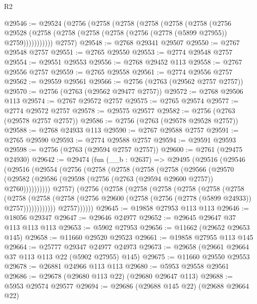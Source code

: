 \begin{lexlean}{R2}
\begin{coremodule}
@29546 := @29524
    (@2756
      (@2758
        (@2758
          (@2758
            (@2758
              (@2758
                (@2756
                  @29528
                  (@2758 (@2758 (@2758 (@2758 (@2756 (@2778 (@5899 @27955)) @2759)))))))))))
      @2757)
@29548 := @2768 @29341 @29507
@29550 := @2767 @29548 @2757
@29551 := @2765 @29550
@29553 := @2774 @29548 @2757
@29554 := @29551 @29553
@29556 := @2768 @29452 @113
@29558 := @2767 @29556 @2757
@29559 := @2765 @29558
@29561 := @2774 @29556 @2757
@29562 := @29559 @29561
@29566 := @2756 (@2763 (@29562 @2757 @2757))
@29570 := @2756 (@2763 (@29562 @29477 @2757))
@29572 := @2768 @29506 @113
@29574 := @2767 @29572 @2757
@29575 := @2765 @29574
@29577 := @2774 @29572 @2757
@29578 := @29575 @29577
@29582 := @2756 (@2763 (@29578 @2757 @2757))
@29586 := @2756 (@2763 (@29578 @29528 @2757))
@29588 := @2768 @24933 @113
@29590 := @2767 @29588 @2757
@29591 := @2765 @29590
@29593 := @2774 @29588 @2757
@29594 := @29591 @29593
@29598 := @2756 (@2763 (@29594 @2757 @2757))
@29600 := @2761 (@29475 @24930)
@29642 := @29474
    (fun (__b : @2637) =>
    @29495
      (@29516
        (@29546
          (@29516
            (@29554
              (@2756
                (@2758
                  (@2758
                    (@2758
                      (@2758
                        (@29566
                          (@29570
                            (@29582
                              (@29586 (@29598 (@2756 (@2763 (@29594 @29600 @2757)) @2760))))))))))
                @2757)
              (@2756
                (@2758
                  (@2758
                    (@2758
                      (@2758
                        (@2758
                          (@2758
                            (@2758
                              (@2758
                                (@2758
                                  (@2756
                                    @29600
                                    (@2758 (@2756 (@2778 (@5899 @24933)) @2757))))))))))))
                @2757))))))
@29645 := @19858 @27953 @113 @113
@29646 := @18056 @29347
@29647 := @29646 @24977
@29652 := @29645 @29647 @37 @113 @113 @113
@29653 := @5902 @27953
@29656 := @11662 (@29652 @29653 @145)
@29658 := @11660 @29520 @29523
@29661 := @19858 @27955 @113 @145
@29664 := @25777 @29347 @24977 @24973
@29673 := @29658 (@29661 @29664 @37 @113 @113 @22 (@5902 @27955) @145)
@29675 := @11660 @29550 @29553
@29678 := @26881 @24966 @113 @113
@29680 := @5953 @29558 @29561
@29686 := @29678 (@29680 @113 @22) (@29680 @29647 @113)
@29688 := @5953 @29574 @29577
@29694 := @29686 (@29688 @145 @22) (@29688 @29664 @22)

\end{coremodule}
\end{lexlean}
